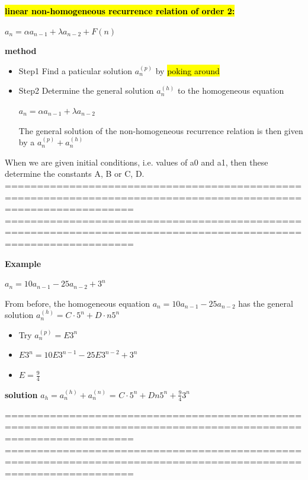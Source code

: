 \documentclass{article}
\begin{document}
\begin{itemize}
\textbf{\hl{linear non-homogeneous recurrence relation of order 2:}}
\begin{center}
$a_n = \alpha a_{n-1} + \lambda a_{n-2} + F(n)$
\end{center}

\textbf{method}
\begin{itemize}
\item {Step1} Find a paticular solution $a_n^{(p)}$ by \hl{poking around}
\item {Step2}  Determine the general solution $a_n^{(h)}$ to the homogeneous equation
\begin{center}
$a_n = \alpha a_{n-1} + \lambda a_{n-2}$
\end{center}
The general solution of the non-homogeneous recurrence relation is then
given by a $a_n^{(p)} + a_n^{(h)}$
\end{itemize}

When we are given initial conditions, i.e. values of a0 and a1, then these
determine the constants A, B or C, D.\\
================================================================================================================
\newpage
================================================================================================================

\textbf{Example}
\begin{center}
$a_n = 10 a_{n-1} - 25 a_{n-2} + 3^n$
\end{center}
From before, the homogeneous equation  $a_n = 10 a_{n-1} - 25 a_{n-2}$ has the  general solution $a_n^{(h)} = C \cdot 5^n +  D \cdot n5^n$ \\
\begin{itemize}
\item Try $a_n^{(p)} = E3^n$
\item $E3^n = 10E3^{n-1} - 25E3^{n-2 } + 3^n$
\item $E = \frac{9}{4}$
\end{itemize}

\textbf{solution} $a_h = a_n^{(h)} + a_n^{(n)}$ = $C \cdot 5^n + Dn5^n + 	\frac{9}{4} 3^n$


================================================================================================================
\newpage
================================================================================================================


\end{itemize}
\end{document}
